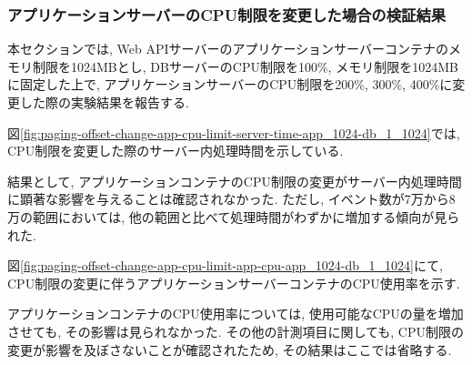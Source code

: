 \documentclass[../../../../main]{subfiles}
\begin{document}
    \subsubsection{アプリケーションサーバーのCPU制限を変更した場合の検証結果}\label{subsubsec:result-paging-offset-change-app-cpu}

    本セクションでは, Web APIサーバーのアプリケーションサーバーコンテナのメモリ制限を1024MBとし, DBサーバーのCPU制限を100\%, メモリ制限を1024MBに固定した上で, アプリケーションサーバーのCPU制限を200\%, 300\%, 400\%に変更した際の実験結果を報告する.


    図\ref{fig:paging-offset-change-app-cpu-limit-server-time-app_1024-db_1_1024}では, CPU制限を変更した際のサーバー内処理時間を示している.

    

    結果として, アプリケーションコンテナのCPU制限の変更がサーバー内処理時間に顕著な影響を与えることは確認されなかった. ただし, イベント数が7万から8万の範囲においては, 他の範囲と比べて処理時間がわずかに増加する傾向が見られた.


    図\ref{fig:paging-offset-change-app-cpu-limit-app-cpu-app_1024-db_1_1024}にて, CPU制限の変更に伴うアプリケーションサーバーコンテナのCPU使用率を示す.

    

    アプリケーションコンテナのCPU使用率については, 使用可能なCPUの量を増加させても, その影響は見られなかった. その他の計測項目に関しても, CPU制限の変更が影響を及ぼさないことが確認されたため, その結果はここでは省略する.
\end{document}
